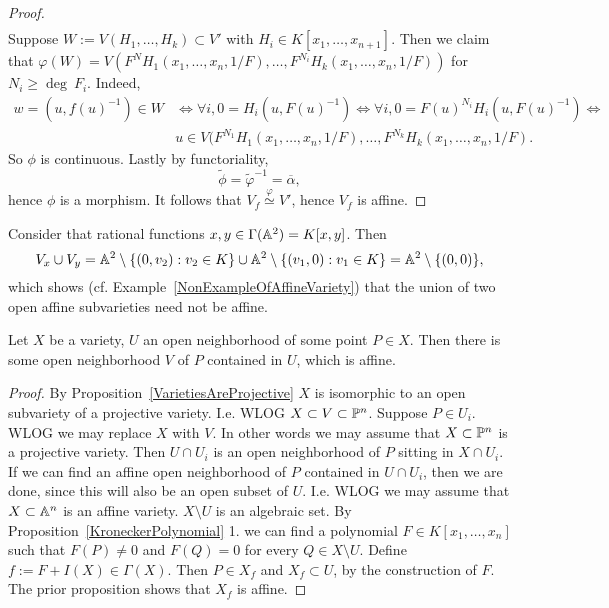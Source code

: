 \begin{proof}
\begin{align*}
        \end{align*}
        Suppose $W:= V(H_1,\dots,H_k)\subset V'$ with $H_i\in K[x_1,\dots,x_{n+1}]$. Then we claim that $\varphi(W)=V\left(F^NH_1(x_1,\dots,x_n,1/F),\dots,F^{N_i}H_k(x_1,\dots,x_n,1/F)\right)$ for $N_i\geq \deg \ F_i$. Indeed, 
        \begin{align*}
            w=(u,f(u)^{-1}) \in W &\iff \forall i,0=H_i(u,F(u)^{-1}) \iff \forall i, 0= F(u)^{N_i}H_i(u,F(u)^{-1}) \iff\\ &u\in V(F^{N_1}H_1(x_1,\dots,x_n,1/F),\dots,F^{N_k}H_k(x_1,\dots,x_n,1/F).
        \end{align*}
        So $\phi$ is continuous. Lastly by functoriality,
        $$\widetilde{\phi} = \widetilde{\varphi}^{-1}=\overline{\alpha},$$
        hence $\phi$ is a morphism. It follows that $V_f\overset{\varphi}{\simeq} V'$, hence $V_f$ is affine.
    \end{proof}
    \begin{example}
         Consider that rational functions $x,y\in \Gamma(\mathbb{A}^2)=K[x,y]$. Then 
         $$V_x\cup V_y= \mathbb{A}^2\setminus \{(0,v_2): v_2\in K\}\cup \mathbb{A}^2\setminus \{(v_1,0): v_1\in K\} = \mathbb{A}^2 \setminus \{(0,0)\},$$
         which shows (cf. Example~\ref{NonExampleOfAffineVariety}) that the union of two open affine subvarieties need not be affine.  
    \end{example}
    \begin{corollary}\label{ThereIsACoveringOfAffineVarieties}
        Let $X$ be a variety, $U$ an open neighborhood of some point $P\in X$. Then there is some open neighborhood $V$ of $P$ contained in $U$, which is affine.
    \end{corollary}
    \begin{proof}
        By Proposition~\ref{VarietiesAreProjective} $X$ is isomorphic to an open subvariety of a projective variety. I.e. WLOG $X\subset V\subset \mathbb{P}^n$. Suppose $P\in U_i$. WLOG we may replace $X$ with $V$. In other words we may assume that $X\subset \mathbb{P}^n$ is a projective variety. Then $U\cap U_i$ is an open neighborhood of $P$ sitting in $X\cap U_i$. If we can find an affine open neighborhood of $P$ contained in $U\cap U_i$, then we are done, since this will also be an open subset of $U$. I.e. WLOG we may assume that $X\subset \mathbb{A}^n$ is an affine variety. $X\setminus U$ is an algebraic set. By Proposition~\ref{KroneckerPolynomial} 1. we can find a polynomial $F\in K[x_1,\dots,x_n]$ such that $F(P)\neq 0$ and $F(Q)=0$ for every $Q\in X\setminus U$. Define $f:= F+I(X)\in \Gamma(X)$. Then $P\in X_f$ and $X_f\subset U$, by the construction of $F$. The prior proposition shows that $X_f$ is affine.    
    \end{proof}
